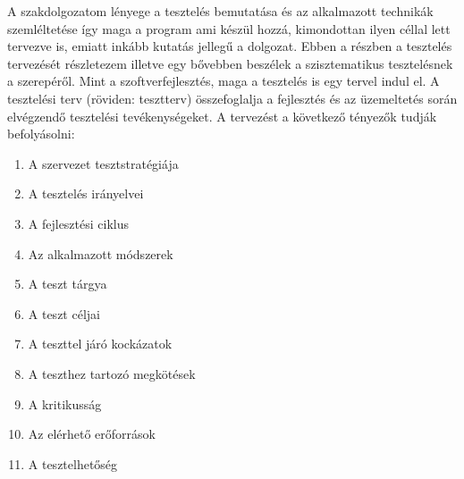 
A szakdolgozatom lényege a tesztelés bemutatása és az alkalmazott technikák szemléltetése így maga a program ami készül hozzá, kimondottan ilyen céllal lett tervezve is, emiatt inkább kutatás jellegű a dolgozat. Ebben a részben a tesztelés tervezését részletezem illetve egy bővebben beszélek a szisztematikus tesztelésnek a szerepéről.
Mint a szoftverfejlesztés, maga a tesztelés is egy tervel indul el.
A tesztelési terv (röviden: tesztterv) összefoglalja a fejlesztés és az üzemeltetés során elvégzendő tesztelési tevékenységeket. A tervezést a következő tényezők tudják befolyásolni:
\begin{enumerate}
\item A szervezet tesztstratégiája
\item A tesztelés irányelvei
\item A fejlesztési ciklus
\item Az alkalmazott módszerek
\item A teszt tárgya
\item A teszt céljai
\item A teszttel járó kockázatok
\item A teszthez tartozó megkötések
\item A kritikusság
\item Az elérhető erőforrások
\item A tesztelhetőség
\end{enumerate}

